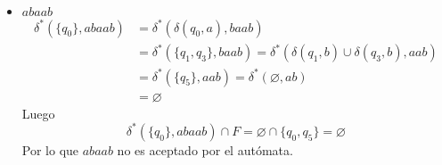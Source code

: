 \documentclass{article}
\begin{document}
\begin{enumerate}
{\begin{itemize}
\begin{enumerate}
{\begin{itemize}
                		$  $\\
                		
                		\item {
                			$abaab$
                			\begin{align*}
                			\delta^{*}(\{q_{0}\}, abaab)
                			&= \delta^{*}(\delta(q_{0}, a), baab) \\
                			&= \delta^{*}(\{q_{1}, q_{3}\}, baab) 
                			= \delta^{*}(\delta(q_{1}, b) 
                			\cup \delta(q_{3}, b), aab) \\
                			&= \delta^{*}(\{q_{5} \}, aab) 
                			= \delta^{*}(\varnothing, ab)\\
                			&= \varnothing            			
                			\end{align*}
                			Luego 
                			\[\delta^{*}(\{q_{0}\}, abaab) \cap F = 
                			\varnothing \cap \{q_{0}, q_{5}\} = \varnothing\]
                			Por lo que $abaab$ no es aceptado por el 
                			autómata.\\
                		}
                	\end{itemize}
                
}
\end{enumerate}
\end{itemize}}
\end{enumerate}
\end{document}
